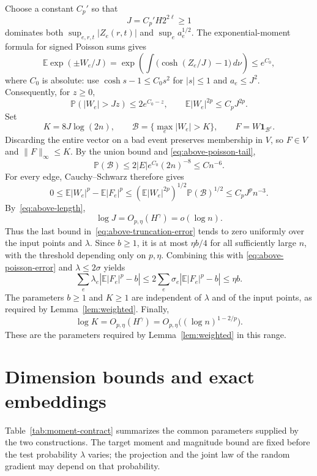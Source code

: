 \documentclass[11pt]{article}
\newcommand{\E}{\mathbb E}
\newcommand{\Prob}{\mathbb P}
\theoremstyle{remark}
\numberwithin{equation}{section}
\begin{document}
Choose a constant $C_p'$ so that
\[
 J=C_p'H2^{2\ell}\ge1
\]
dominates both $\sup_{e,r,t}|Z_e(r,t)|$ and
$\sup_e a_e^{1/2}$. The exponential-moment formula for signed
Poisson sums gives
\[
 \E\exp(\pm W_e/J)
 =\exp\left(\int\bigl(\cosh(Z_e/J)-1\bigr)\,d\nu\right)
 \le e^{C_0},
\]
where $C_0$ is absolute: use
$\cosh s-1\le C_0s^2$ for $|s|\le1$ and $a_e\le J^2$.
Consequently, for $z\ge0$,
\begin{equation}
 \Prob(|W_e|>Jz)\le2e^{C_0-z},
 \qquad \E|W_e|^{2p}\le C_pJ^{2p}.
 \label{eq:above-poisson-tail}
\end{equation}
Set
\[
 K=8J\log(2n),\qquad
 \mathcal B=\{\max_e|W_e|>K\},\qquad
 F=W\mathbf 1_{\mathcal B^c}.
\]
Discarding the entire vector on a bad event preserves membership in
$V$, so $F\in V$ and $\|F\|_\infty\le K$. By the union bound and
\eqref{eq:above-poisson-tail},
\[
 \Prob(\mathcal B)
 \le2|E|e^{C_0}(2n)^{-8}\le Cn^{-6}.
\]
For every edge, Cauchy--Schwarz therefore gives
\begin{equation}
 0\le\E|W_e|^p-\E|F_e|^p
   \le (\E|W_e|^{2p})^{1/2}\Prob(\mathcal B)^{1/2}
   \le C_pJ^pn^{-3}.
 \label{eq:above-truncation-error}
\end{equation}
By~\eqref{eq:above-length},
\[
 \log J=O_{p,\eta}(H^\gamma)=o(\log n).
\]
Thus the last bound in~\eqref{eq:above-truncation-error} tends to
zero uniformly over the input points and $\lambda$. Since $b\ge1$,
it is at most $\eta b/4$ for all sufficiently large $n$, with the
threshold depending only on $p,\eta$. Combining this with
\eqref{eq:above-poisson-error} and $\lambda\le2\sigma$ yields
\[
 \sum_e\lambda_e\left|\E|F_e|^p-b\right|
 \le2\sum_e\sigma_e\left|\E|F_e|^p-b\right|
 \le\eta b.
\]
The parameters $b\ge1$ and $K\ge1$ are independent of $\lambda$
and of the input points, as required by Lemma~\ref{lem:weighted}.
Finally,
\[
 \log K=O_{p,\eta}(H^\gamma)
         =O_{p,\eta}\bigl((\log n)^{1-2/p}\bigr).
\]
These are the parameters required by Lemma~\ref{lem:weighted} in this range.

\section{Dimension bounds and exact embeddings}

Table~\ref{tab:moment-contract} summarizes the common parameters supplied
by the two constructions. The target moment and magnitude bound are fixed
before the test probability $\lambda$ varies; the projection and the joint
law of the random gradient may depend on that probability.
\end{document}
